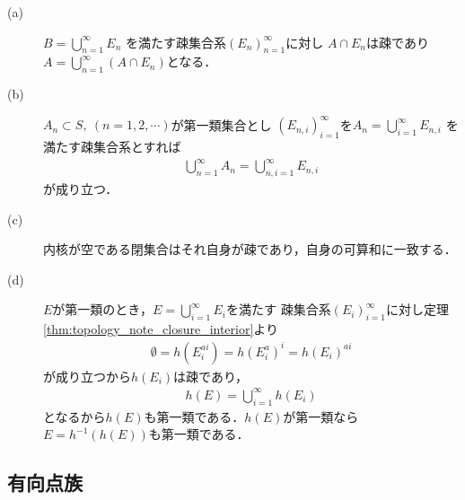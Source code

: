	\begin{prf}\mbox{}
		\begin{description}
			\item[(a)] $B = \bigcup_{n=1}^\infty E_n$
				を満たす疎集合系$(E_n)_{n=1}^\infty$に対し
				$A \cap E_n$は疎であり$A = \bigcup_{n=1}^\infty (A \cap E_n)$となる．
			\item[(b)] $A_n \subset S,\ (n=1,2,\cdots)$が第一類集合とし
				$(E_{n,i})_{i=1}^\infty$を$A_n = \bigcup_{i=1}^\infty E_{n,i}$
				を満たす疎集合系とすれば
				\begin{align}
					\bigcup_{n=1}^\infty A_n
					= \bigcup_{n,i=1}^\infty E_{n,i}
				\end{align}
				が成り立つ．
				
			\item[(c)] 内核が空である閉集合はそれ自身が疎であり，自身の可算和に一致する．
			\item[(d)] $E$が第一類のとき，$E = \bigcup_{i=1}^\infty E_i$を満たす
				疎集合系$(E_i)_{i=1}^\infty$に対し定理\ref{thm:topology_note_closure_interior}より
				\begin{align}
					\emptyset = h(E_i^{ai})
					= h(E_i^a)^i
					= h(E_i)^{ai}
				\end{align}
				が成り立つから$h(E_i)$は疎であり，
				\begin{align}
					h(E) = \bigcup_{i=1}^\infty h(E_i)
				\end{align}
				となるから$h(E)$も第一類である．$h(E)$が第一類なら$E = h^{-1}(h(E))$も第一類である．
				\QED
		\end{description}
	\end{prf}
	
\subsection{有向点族}
